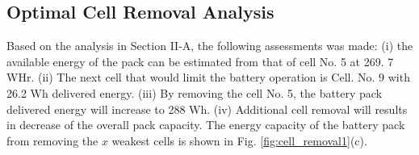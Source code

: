 \documentclass[10pt,twocolumn]{IEEEtran}
\begin{document}
\subsection{Optimal Cell Removal Analysis}


Based on the analysis in Section II-A, the following assessments was made: 
(i) the available energy of the pack can be estimated from that of cell No.  5 at 269. 7 WHr.
(ii) The next cell that would limit the battery operation is Cell. No. 9 with 26.2 Wh delivered energy.
(iii) By removing the cell No. 5, the battery pack delivered energy will increase to 288 Wh.
(iv) Additional cell removal will results in decrease of the overall pack capacity.
The energy capacity of the battery pack from removing the $x$ weakest cells is shown in Fig.  \ref{fig:cell_removal1}(c). 


%  
\vspace{-0.3cm}
\end{document}
